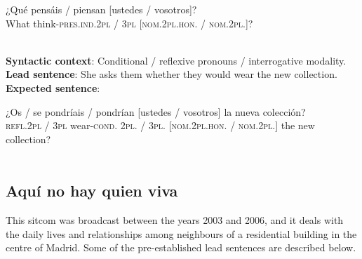 \documentclass[output=paper]{LSP/langsci}
\begin{document}
\begin{enumerate}
\ea
\gll
{¿Qué}    {pensáis / piensan}           {[ustedes / vosotros]?}\\
What  {think-\textsc{pres.ind.2pl / 3pl}}    {\textsc{[nom.2pl.hon. / nom.2pl.]}?}\\
\\
\z

\textbf{Syntactic context}: Conditional / reflexive pronouns / interrogative modality.\\
\textbf{Lead sentence}: She asks them whether they would wear the new collection.\\
\textbf{Expected sentence}:

\ea
\gll
{¿Os / se} {pondríais / pondrían}     {[ustedes / vosotros]}   la nueva colección?\\     
{\textsc{refl.2pl / 3pl}}  {wear-\textsc{cond. 2pl. / 3pl.}}  {\textsc{[nom.2pl.hon. / nom.2pl.]}} the new collection?\\
\\
\z

\end{enumerate}

\subsection{Aquí no hay quien viva}
This sitcom was broadcast between the years 2003 and 2006, and it deals with the daily lives and relationships among neighbours of a residential building in the centre of Madrid. Some of the pre-established lead sentences are described below.
\end{document}
